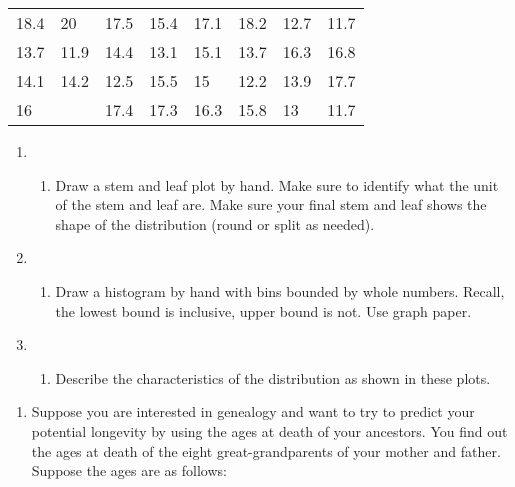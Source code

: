 \documentclass[
  letterpaper,
  DIV=11,
  numbers=noendperiod]{scrartcl}
\providecommand{\tightlist}{%
  \setlength{\itemsep}{0pt}\setlength{\parskip}{0pt}}\usepackage{longtable,booktabs,array}
\begin{document}
\begin{longtable}[]{@{}llllllll@{}}
\toprule()
\endhead
18.4 & 20 & 17.5 & 15.4 & 17.1 & 18.2 & 12.7 & 11.7 \\
13.7 & 11.9 & 14.4 & 13.1 & 15.1 & 13.7 & 16.3 & 16.8 \\
14.1 & 14.2 & 12.5 & 15.5 & 15 & 12.2 & 13.9 & 17.7 \\
16 & & 17.4 & 17.3 & 16.3 & 15.8 & 13 & 11.7 \\
\bottomrule()
\end{longtable}

\begin{enumerate}
\def\labelenumi{\alph{enumi}.}
\item
  \begin{enumerate}
  \def\labelenumii{(\arabic{enumii})}
  \setcounter{enumii}{2}
  \tightlist
  \item
    Draw a stem and leaf plot by hand. Make sure to identify what the
    unit of the stem and leaf are. Make sure your final stem and leaf
    shows the shape of the distribution (round or split as needed).
  \end{enumerate}
\item
  \begin{enumerate}
  \def\labelenumii{(\arabic{enumii})}
  \setcounter{enumii}{2}
  \tightlist
  \item
    Draw a histogram by hand with bins bounded by whole numbers. Recall,
    the lowest bound is inclusive, upper bound is not. Use graph paper.
  \end{enumerate}
\item
  \begin{enumerate}
  \def\labelenumii{(\arabic{enumii})}
  \setcounter{enumii}{1}
  \tightlist
  \item
    Describe the characteristics of the distribution as shown in these
    plots.
  \end{enumerate}
\end{enumerate}

\begin{enumerate}
\def\labelenumi{\arabic{enumi}.}
\setcounter{enumi}{2}
\tightlist
\item
  Suppose you are interested in genealogy and want to try to predict
  your potential longevity by using the ages at death of your ancestors.
  You find out the ages at death of the eight great-grandparents of your
  mother and father. Suppose the ages are as follows:
\end{enumerate}
\end{document}
